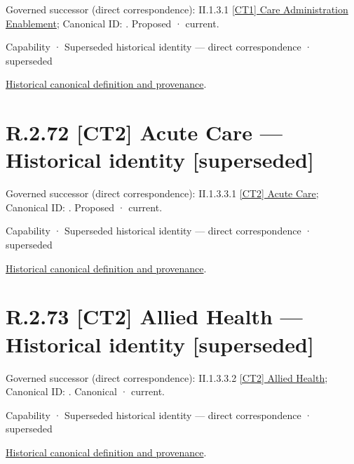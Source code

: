 {\small Governed successor (direct correspondence): II.1.3.1 \hyperref[element:28df27d55c514a37995145ab46945f78]{[CT1] Care Administration Enablement}; Canonical ID: \texttt{}. Proposed · current.}\par
\label{element:b611a1fcfadb4b30af9ba74a4c993d8a}
{\small Capability · Superseded historical identity — direct correspondence · superseded}\par
\href{../../../../continuum/strategy/capability/b611a1fcfadb4b30af9ba74a4c993d8a.md}{Historical canonical definition and provenance}.\par
\section*{R.2.72 [CT2] Acute Care — Historical identity [superseded]}
\label{navigation:R.2.72}

{\small Governed successor (direct correspondence): II.1.3.3.1 \hyperref[element:9bb988c526404522b83aeed5069e0eb5]{[CT2] Acute Care}; Canonical ID: \texttt{}. Proposed · current.}\par
\label{element:7b591957f7424424abc80f699e9f1960}
{\small Capability · Superseded historical identity — direct correspondence · superseded}\par
\href{../../../../continuum/strategy/capability/7b591957f7424424abc80f699e9f1960.md}{Historical canonical definition and provenance}.\par
\section*{R.2.73 [CT2] Allied Health — Historical identity [superseded]}
\label{navigation:R.2.73}

{\small Governed successor (direct correspondence): II.1.3.3.2 \hyperref[element:63cd714a3e2a4354aa5383b189fea566]{[CT2] Allied Health}; Canonical ID: \texttt{}. Canonical · current.}\par
\label{element:6cd45c27d0c344b9807174dbd812d572}
{\small Capability · Superseded historical identity — direct correspondence · superseded}\par
\href{../../../../continuum/strategy/capability/6cd45c27d0c344b9807174dbd812d572.md}{Historical canonical definition and provenance}.\par
